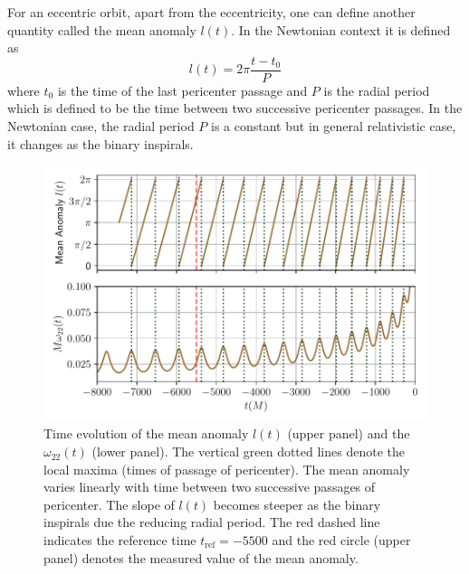 \documentclass[aps,prd,amsmath,floats,floatfix, twocolumn,
superscriptaddress,nofootinbib,showpacs]{revtex4-1}
\begin{document}
For an eccentric orbit, apart from the eccentricity, one can define another quantity called the mean anomaly $l(t)$. In the Newtonian context it is defined as
\begin{equation}
\label{eq:mean_anomaly_definition}
l(t) = 2\pi \frac{t - t_0}{P}
\end{equation}
where $t_0$ is the time of the last pericenter passage and $P$ is the radial period which is defined to be the time between two successive pericenter passages.
In the Newtonian case, the radial period $P$ is a constant but in general relativistic case, it changes as the binary inspirals.

\begin{figure}[thb]
\includegraphics[width=\columnwidth]{mean_ano_definition}
\caption{Time evolution of the mean anomaly $l(t)$ (upper panel) and the $\omega_{22}(t)$ (lower panel).
  The vertical green dotted lines denote the local maxima (times of passage of pericenter). The mean anomaly
  varies linearly with time between two successive passages of pericenter. The slope of $l(t)$ becomes steeper as the binary
  inspirals due the reducing radial period. The red dashed line indicates the reference time $t_{\text{ref}}=-5500$ and the
  red circle (upper panel) denotes the measured value of the mean anomaly.}
\label{fig:mean_anomaly_definition}
\end{figure}


\end{document}
